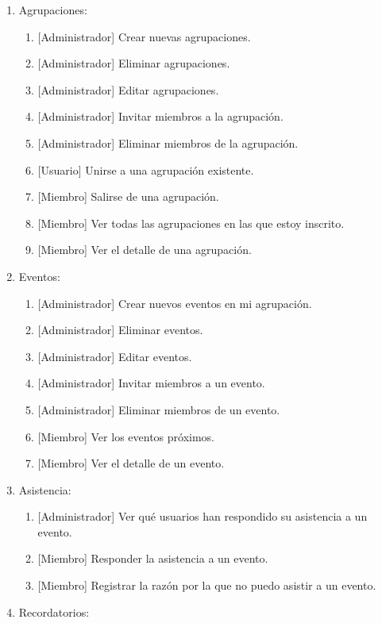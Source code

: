 \begin{enumerate}
    \item Agrupaciones:
    \begin{enumerate}
        \item {[Administrador]} Crear nuevas agrupaciones.
        \item {[Administrador]} Eliminar agrupaciones.
        \item {[Administrador]} Editar agrupaciones.
        \item {[Administrador]} Invitar miembros a la agrupación.
        \item {[Administrador]} Eliminar miembros de la agrupación.
        \item {[Usuario]} Unirse a una agrupación existente.
        \item {[Miembro]} Salirse de una agrupación.
        \item {[Miembro]} Ver todas las agrupaciones en las que estoy inscrito.
        \item {[Miembro]} Ver el detalle de una agrupación.
    \end{enumerate}
    \item Eventos:
    \begin{enumerate}
        \item {[Administrador]} Crear nuevos eventos en mi agrupación.
        \item {[Administrador]} Eliminar eventos.
        \item {[Administrador]} Editar eventos.
        \item {[Administrador]} Invitar miembros a un evento.
        \item {[Administrador]} Eliminar miembros de un evento.
        \item {[Miembro]} Ver los eventos próximos.
        \item {[Miembro]} Ver el detalle de un evento.
    \end{enumerate}
    \item Asistencia:
    \begin{enumerate}
        \item {[Administrador]} Ver qué usuarios han respondido su asistencia a un evento.
        \item {[Miembro]} Responder la asistencia a un evento.
        \item {[Miembro]} Registrar la razón por la que no puedo asistir a un evento.
    \end{enumerate}
    \item Recordatorios:

\end{enumerate}
